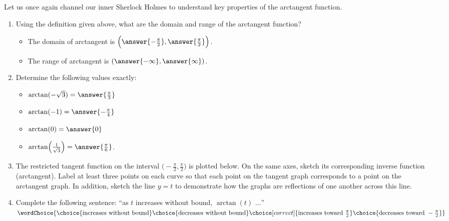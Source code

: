 \documentclass{ximera}
\begin{document}
\begin{problem}
Let us once again channel our inner Sherlock Holmes to understand key properties of the arctangent function.%
\par
\begin{enumerate}
\item Using the definition given above, what are the domain and range of the arctangent function?
%
\begin{itemize}
\item The domain of arctangent is $\Big(\answer{-\frac{\pi}{2}} , \answer{\frac{\pi}{2}} \Big)$.
%
\item The range of arctangent is $(\answer{-\infty} , \answer{\infty})$.
\end{itemize}
%
\item Determine the following values exactly: 
\begin{itemize}
\item $\arctan(-\sqrt{3}) = \answer{\frac{\pi}{3}}$
%
\item $\arctan(-1) = \answer{-\frac{\pi}{4}}$
%
\item $\arctan(0) = \answer{0}$
%
\item $\arctan\!\Big(\frac{1}{\sqrt{3}}\Big) = \answer{\frac{\pi}{6}}$.
\end{itemize}
%
\item The restricted tangent function on the interval $\Big(\!-\frac{\pi}{2}, \frac{\pi}{2}\Big)$ is plotted below. On the same axes, sketch its corresponding inverse function (arctangent).  Label at least three points on each curve so that each point on the tangent graph corresponds to a point on the arctangent graph. In addition, sketch the line $y = t$ to demonstrate how the graphs are reflections of one another across this line.%
%
\item Complete the following sentence:  ``as $t$ increases without bound, $\arctan(t)$ $\ldots$'' $\wordChoice{\choice{\text{increases without bound}}\choice{\text{decreases without bound}}\choice[correct]{\text{increases toward } \frac{\pi}{2}}\choice{\text{decreases toward } -\frac{\pi}{2}}}$%
\end{enumerate}

\end{problem}
\end{document}
